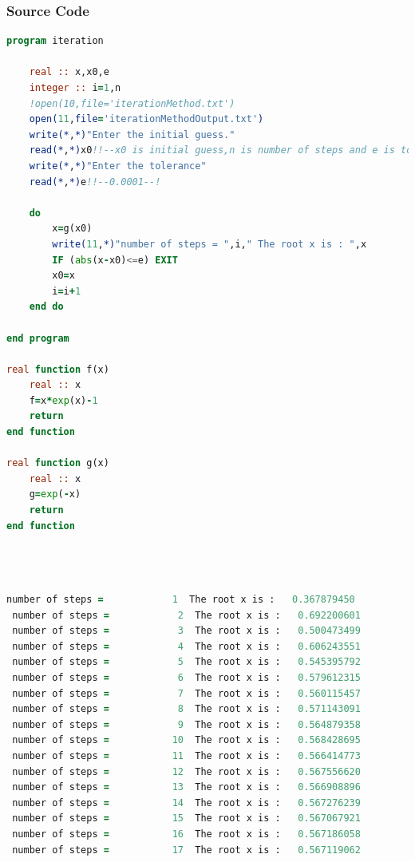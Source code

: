 \documentclass{article}
\begin{document}
\subsubsection{Source Code}
\begin{lstlisting}[language=Fortran,caption=Iterative Method]
program iteration

    real :: x,x0,e
    integer :: i=1,n
    !open(10,file='iterationMethod.txt')
    open(11,file='iterationMethodOutput.txt')
    write(*,*)"Enter the initial guess."
    read(*,*)x0!!--x0 is initial guess,n is number of steps and e is tolerance up to--!!
    write(*,*)"Enter the tolerance"
    read(*,*)e!!--0.0001--!

    do
        x=g(x0)
        write(11,*)"number of steps = ",i," The root x is : ",x
        IF (abs(x-x0)<=e) EXIT
        x0=x
        i=i+1
    end do

end program

real function f(x)
    real :: x
    f=x*exp(x)-1
    return
end function

real function g(x)
    real :: x
    g=exp(-x)
    return
end function





\end{lstlisting}
\begin{lstlisting}[language=Fortran,caption=Iterative Method Output]
 number of steps =            1  The root x is :   0.367879450    
 number of steps =            2  The root x is :   0.692200601    
 number of steps =            3  The root x is :   0.500473499    
 number of steps =            4  The root x is :   0.606243551    
 number of steps =            5  The root x is :   0.545395792    
 number of steps =            6  The root x is :   0.579612315    
 number of steps =            7  The root x is :   0.560115457    
 number of steps =            8  The root x is :   0.571143091    
 number of steps =            9  The root x is :   0.564879358    
 number of steps =           10  The root x is :   0.568428695    
 number of steps =           11  The root x is :   0.566414773    
 number of steps =           12  The root x is :   0.567556620    
 number of steps =           13  The root x is :   0.566908896    
 number of steps =           14  The root x is :   0.567276239    
 number of steps =           15  The root x is :   0.567067921    
 number of steps =           16  The root x is :   0.567186058    
 number of steps =           17  The root x is :   0.567119062    
 
\end{lstlisting}
\newpage
\end{document}
